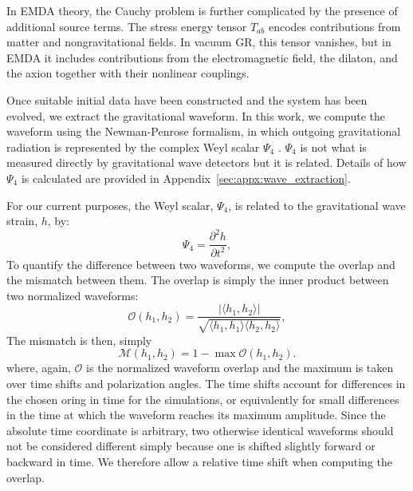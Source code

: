 In EMDA theory, the Cauchy problem is further complicated by the presence of additional source terms. The stress energy tensor $T_{ab}$ encodes contributions from matter and nongravitational fields. In vacuum GR, this tensor vanishes, but in EMDA it includes contributions from the electromagnetic field, the dilaton, and the axion together with their nonlinear couplings. 


Once suitable initial data have been constructed and the system has been evolved, we extract the gravitational waveform. In this work, we compute the waveform using the Newman-Penrose formalism, in which outgoing gravitational radiation is represented by the complex Weyl scalar $\Psi_4$ \cite{Newman1962}. 
$\Psi_4 $ is not what is measured directly by gravitational wave detectors but it is related. Details of how $\Psi_4$ is calculated are provided in Appendix~\ref{sec:appx:wave_extraction}.

For our current purposes, the Weyl scalar, $\Psi_4$, is related to the gravitational wave strain, $h$, by:
\begin{equation}
\Psi_4 = \frac{\partial^2 h}{\partial t^2},
\end{equation}
 To quantify the difference between two waveforms, we compute the overlap and the mismatch between them.  The overlap is simply the inner product between two normalized waveforms:  
\begin{equation}
    \mathcal{O}(h_1,h_2) 
    =
    \frac{
        \left|
        \langle h_1,h_2\rangle
        \right|
    }{
        \sqrt{
            \langle h_1,h_1\rangle
            \langle h_2,h_2\rangle
        }
    },
    \label{eq:app-waveex-time-overlap}
\end{equation}
The mismatch is then, simply 
\begin{equation}
    \mathcal{M}(h_1,h_2)
    =
    1-\max \mathcal{O}(h_1,h_2).
    \label{eq:app-waveex-mismatch-basic}
\end{equation}
where, again, $\mathcal{O}$ is the normalized waveform overlap and the maximum is taken over time shifts and polarization angles. The time shifts account for differences in the chosen oring in time for the simulations, or equivalently for small differences in the time at which the waveform reaches its maximum amplitude. Since the absolute time coordinate is arbitrary, two otherwise identical waveforms should not be considered different simply because one is shifted slightly forward or backward in time. We therefore allow a relative time shift when computing the overlap.


